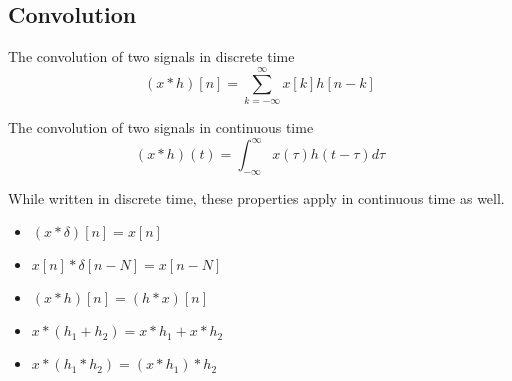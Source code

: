 \subsection{Convolution}
\begin{definition}
    The convolution of two signals in discrete time
    \[
	  (x*h)[n] = \sum_{k=-\infty}^{\infty}{x[k]h[n-k]}
	\]
\end{definition}
\begin{definition}
    The convolution of two signals in continuous time
    \[
(x*h)(t) = \int_{-\infty}^{\infty}{x(\tau)h(t-\tau)d\tau}
\]
\end{definition}
While written in discrete time, these properties apply in continuous time as well.
\begin{itemize}
    \item $(x*\delta)[n] = x[n]$
    \item $x[n]*\delta[n-N]=x[n-N]$
    \item $(x*h)[n] = (h*x)[n]$
    \item $x * (h_1 + h_2) = x*h_1 + x*h_2$
    \item $x * (h_1 * h_2) = (x * h_1) * h_2$
\end{itemize}
